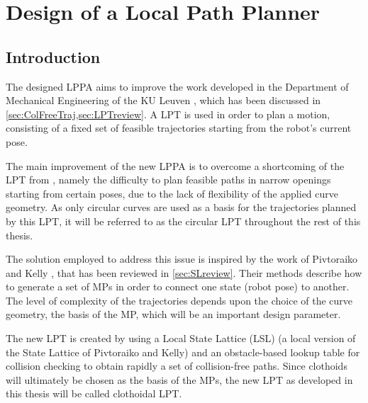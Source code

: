\chapter{Design of a Local Path Planner} \label{cha:Design}
\vspace{-1.56em}
\section{Introduction}
The designed LPPA aims to improve the work developed in the Department of Mechanical Engineering of the KU Leuven \cite{DemeesterEtAl2012}, which has been discussed in \cref{sec:ColFreeTraj,sec:LPTreview}. A LPT is used in order to plan a motion, consisting of a fixed set of feasible trajectories starting from the robot's current pose.

The main improvement of the new LPPA is to overcome a shortcoming of the LPT from \cite{DemeesterEtAl2012}, namely the difficulty to plan feasible paths in narrow openings starting from certain poses, due to the lack of flexibility of the applied curve geometry. As only circular curves are used as a basis for the trajectories planned by this LPT, it will be referred to as the circular LPT throughout the rest of this thesis.

The solution employed to address this issue is inspired by the work of Pivtoraiko and Kelly \cite{PivtoraikoKelly2005,PivtoraikoEtAl2009,PivtoraikoKelly2012}, that has been reviewed in \cref{sec:SLreview}. Their methods describe how to generate a set of MPs in order to connect one state (robot pose) to another. The level of complexity of the trajectories depends upon the choice of the curve geometry, the basis of the MP, which will be an important design parameter.

The new LPT is created by using a Local State Lattice (LSL) (a local version of the State Lattice of Pivtoraiko and Kelly) and an obstacle-based lookup table for collision checking to obtain rapidly a set of collision-free paths. Since clothoids will ultimately be chosen as the basis of the MPs, the new LPT as developed in this thesis will be called clothoidal LPT.


